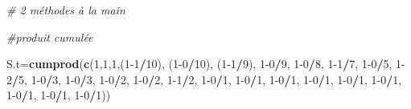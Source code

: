 \documentclass[
]{article}
\newenvironment{Shaded}{\begin{snugshade}}{\end{snugshade}}
\newcommand{\CommentTok}[1]{\textcolor[rgb]{0.56,0.35,0.01}{\textit{#1}}}
\newcommand{\DecValTok}[1]{\textcolor[rgb]{0.00,0.00,0.81}{#1}}
\newcommand{\KeywordTok}[1]{\textcolor[rgb]{0.13,0.29,0.53}{\textbf{#1}}}
\newcommand{\NormalTok}[1]{#1}
\newcommand{\OperatorTok}[1]{\textcolor[rgb]{0.81,0.36,0.00}{\textbf{#1}}}
\begin{document}
\begin{Shaded}
\begin{Highlighting}[]
\CommentTok{# 2 méthodes à la main}

\CommentTok{#produit cumulée}

\NormalTok{S.t=}\KeywordTok{cumprod}\NormalTok{(}\KeywordTok{c}\NormalTok{(}\DecValTok{1}\NormalTok{,}\DecValTok{1}\NormalTok{,}\DecValTok{1}\NormalTok{,(}\DecValTok{1-1}\OperatorTok{/}\DecValTok{10}\NormalTok{), (}\DecValTok{1-0}\OperatorTok{/}\DecValTok{10}\NormalTok{), (}\DecValTok{1-1}\OperatorTok{/}\DecValTok{9}\NormalTok{), }\DecValTok{1-0}\OperatorTok{/}\DecValTok{9}\NormalTok{, }\DecValTok{1-0}\OperatorTok{/}\DecValTok{8}\NormalTok{, }\DecValTok{1-1}\OperatorTok{/}\DecValTok{7}\NormalTok{, }\DecValTok{1-0}\OperatorTok{/}\DecValTok{5}\NormalTok{, }
              \DecValTok{1-2}\OperatorTok{/}\DecValTok{5}\NormalTok{, }\DecValTok{1-0}\OperatorTok{/}\DecValTok{3}\NormalTok{, }\DecValTok{1-0}\OperatorTok{/}\DecValTok{3}\NormalTok{, }\DecValTok{1-0}\OperatorTok{/}\DecValTok{2}\NormalTok{, }\DecValTok{1-0}\OperatorTok{/}\DecValTok{2}\NormalTok{, }\DecValTok{1-1}\OperatorTok{/}\DecValTok{2}\NormalTok{, }\DecValTok{1-0}\OperatorTok{/}\DecValTok{1}\NormalTok{, }\DecValTok{1-0}\OperatorTok{/}\DecValTok{1}\NormalTok{, }\DecValTok{1-0}\OperatorTok{/}\DecValTok{1}\NormalTok{, }
              \DecValTok{1-0}\OperatorTok{/}\DecValTok{1}\NormalTok{, }\DecValTok{1-0}\OperatorTok{/}\DecValTok{1}\NormalTok{, }\DecValTok{1-0}\OperatorTok{/}\DecValTok{1}\NormalTok{, }\DecValTok{1-0}\OperatorTok{/}\DecValTok{1}\NormalTok{, }\DecValTok{1-0}\OperatorTok{/}\DecValTok{1}\NormalTok{, }\DecValTok{1-0}\OperatorTok{/}\DecValTok{1}\NormalTok{))}


\end{Highlighting}
\end{Shaded}
\end{document}
